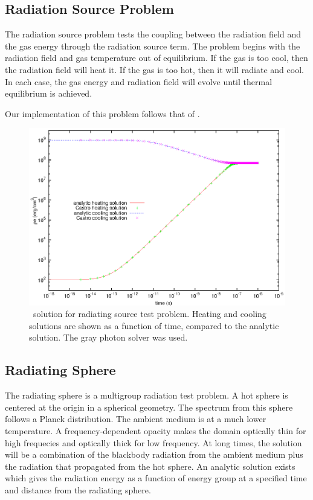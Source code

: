 \subsection{Radiation Source Problem}

The radiation source problem tests the coupling between the radiation
field and the gas energy through the radiation source term.  The
problem begins with the radiation field and gas temperature out of
equilibrium.  If the gas is too cool, then the radiation field will
heat it.  If the gas is too hot, then it will radiate and cool.  In
each case, the gas energy and radiation field will evolve until
thermal equilibrium is achieved.

Our implementation of this problem follows that of
\cite{swestymyra:2009}.

\begin{figure}[h]
\centering
\includegraphics[width=5.0in]{radiating_source}
\caption{\label{fig:radsource} \castro\ solution for radiating source
  test problem.  Heating and cooling solutions are shown as a function
  of time, compared to the analytic solution.  The gray photon solver
  was used.}
\end{figure}


\subsection{Radiating Sphere}

The radiating sphere is a multigroup radiation test problem.  A hot
sphere is centered at the origin in a spherical geometry.  The
spectrum from this sphere follows a Planck distribution.  The ambient
medium is at a much lower temperature.  A frequency-dependent opacity
makes the domain optically thin for high frequecies and optically
thick for low frequency.  At long times, the solution will be a
combination of the blackbody radiation from the ambient medium plus
the radiation that propagated from the hot sphere.  An analytic
solution exists \cite{graziani:2008} which gives the radiation energy
as a function of energy group at a specified time and distance from
the radiating sphere.

